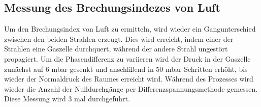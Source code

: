     \subsection{Messung des Brechungsindezes von Luft}
        Um den Brechungsindex von Luft zu ermitteln, wird wieder ein Gangunterschied zwischen den beiden Strahlen erzeugt. Dies wird erreicht, indem einer der Strahlen eine Gaszelle durchquert, während der 
        andere Strahl ungestört propagiert. Um die Phasendifferenz zu variieren wird der Druck in der Gaszelle zunächst auf 6 mbar gesenkt und anschlißend in 50 mbar-Schritten erhöht, bis wieder der Normaldruck
        des Raumes erreicht wird. Während des Prozesses wird wieder die Anzahl der Nulldurchgänge per Differenzspannungsmethode gemessen. Diese Messung wird 3 mal durchgeführt.
        
